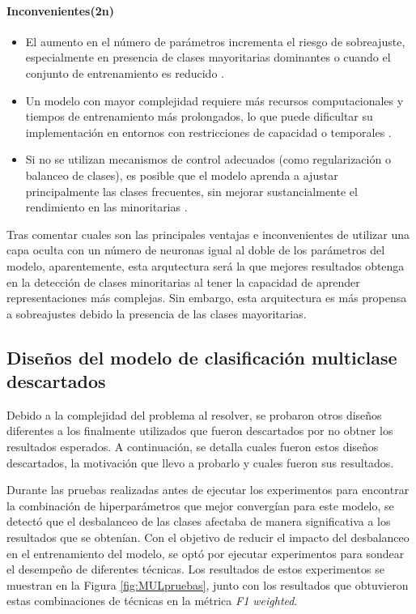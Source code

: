 \paragraph{Inconvenientes(2n)}
\begin{itemize}
	\item El aumento en el número de parámetros incrementa el riesgo de sobreajuste, especialmente en presencia de clases mayoritarias dominantes o cuando el conjunto de entrenamiento es reducido \cite{srivastava2014dropout}.
	\item Un modelo con mayor complejidad requiere más recursos computacionales y tiempos de entrenamiento más prolongados, lo que puede dificultar su implementación en entornos con restricciones de capacidad o temporales \cite{han2015deep}.
	\item Si no se utilizan mecanismos de control adecuados (como regularización o balanceo de clases), es posible que el modelo aprenda a ajustar principalmente las clases frecuentes, sin mejorar sustancialmente el rendimiento en las minoritarias \cite{chawla2002smote}.

\end{itemize}

Tras comentar cuales son las principales ventajas e inconvenientes de utilizar una capa oculta con un número de neuronas igual al doble de los parámetros del modelo, aparentemente, esta arqutectura será la que mejores resultados obtenga en la detección de clases minoritarias al tener la capacidad de aprender representaciones más complejas. Sin embargo, esta arquitectura es más propensa a sobreajustes debido la presencia de las clases mayoritarias.

\subsection{Diseños del modelo de clasificación multiclase descartados} \label{subsec:MCMdescart}

Debido a la complejidad del problema al resolver, se probaron otros diseños diferentes a los finalmente utilizados que fueron descartados por no obtner los resultados esperados. A continuación, se detalla cuales fueron estos diseños descartados, la motivación que llevo a probarlo y cuales fueron sus resultados.

Durante las pruebas realizadas antes de ejecutar los experimentos para encontrar la combinación de hiperparámetros que mejor convergían para este modelo, se detectó que el desbalanceo de las clases afectaba de manera significativa a los resultados que se obtenían. Con el objetivo de reducir el impacto del desbalanceo en el entrenamiento del modelo, se optó por ejecutar experimentos para sondear el desempeño de diferentes técnicas. Los resultados de estos experimentos se muestran en la Figura  \ref{fig:MULpruebas}, junto con los resultados que obtuvieron estas combinaciones de técnicas en la métrica \textit{F1 weighted}.


